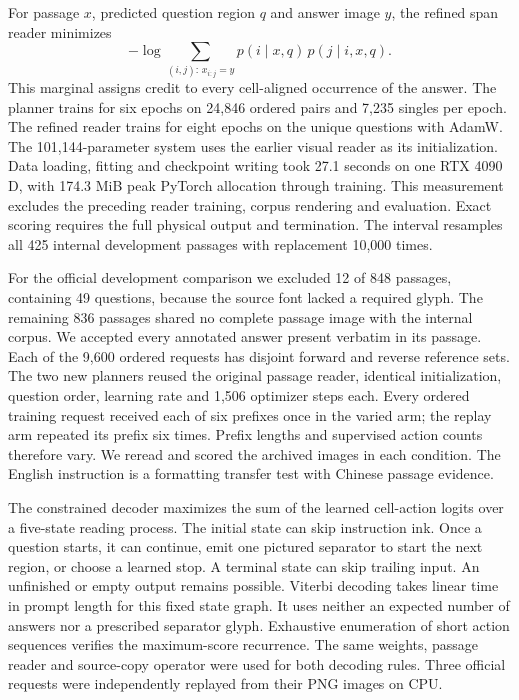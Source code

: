 \documentclass[12pt,a4paper]{article}
\providecommand{\DIFadd}[1]{{\protect\color{blue} \sf #1}} %
\begin{document}
\DIFadd{For passage $x$, predicted question region $q$ and answer image $y$, the refined span reader minimizes
}\[
-\log \sum_{(i,j):\,x_{i:j}=y} p(i\mid x,q)\,p(j\mid i,x,q).
\]
\DIFadd{This marginal assigns credit to every cell-aligned occurrence of the answer. The planner trains for six epochs on 24,846 ordered pairs and 7,235 singles per epoch. The refined reader trains for eight epochs on the unique questions with AdamW. The 101,144-parameter system uses the earlier visual reader as its initialization. Data loading, fitting and checkpoint writing took 27.1 seconds on one RTX 4090 D, with 174.3 MiB peak PyTorch allocation through training. This measurement excludes the preceding reader training, corpus rendering and evaluation. Exact scoring requires the full physical output and termination. The interval resamples all 425 internal development passages with replacement 10,000 times.
}

\DIFadd{For the official development comparison we excluded 12 of 848 passages, containing 49 questions, because the source font lacked a required glyph. The remaining 836 passages shared no complete passage image with the internal corpus. We accepted every annotated answer present verbatim in its passage. Each of the 9,600 ordered requests has disjoint forward and reverse reference sets. The two new planners reused the original passage reader, identical initialization, question order, learning rate and 1,506 optimizer steps each. Every ordered training request received each of six prefixes once in the varied arm; the replay arm repeated its prefix six times. Prefix lengths and supervised action counts therefore vary. We reread and scored the archived images in each condition. The English instruction is a formatting transfer test with Chinese passage evidence.
}

\DIFadd{The constrained decoder maximizes the sum of the learned cell-action logits over a five-state reading process. The initial state can skip instruction ink. Once a question starts, it can continue, emit one pictured separator to start the next region, or choose a learned stop. A terminal state can skip trailing input. An unfinished or empty output remains possible. Viterbi decoding takes linear time in prompt length for this fixed state graph. It uses neither an expected number of answers nor a prescribed separator glyph. Exhaustive enumeration of short action sequences verifies the maximum-score recurrence. The same weights, passage reader and source-copy operator were used for both decoding rules. Three official requests were independently replayed from their PNG images on CPU.
}
\end{document}

